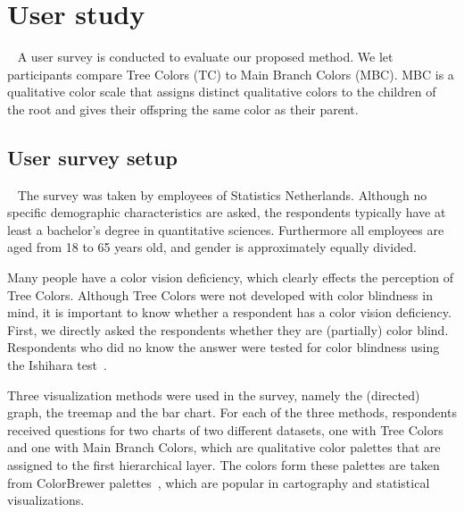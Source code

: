 \documentclass[journal]{vgtc}                %
\begin{document}
\section{User study}~\label{secuser}
A user survey is conducted to evaluate our proposed method. We let participants compare Tree Colors (TC) to Main Branch Colors (MBC). MBC is a qualitative color scale that assigns distinct qualitative colors to the children of the root and gives their offspring the same color as their parent.

\subsection{User survey setup}~\label{secusersetup}
The survey was taken by employees of Statistics Netherlands. Although no specific 
demographic characteristics are asked, the respondents typically have at least a bachelor's degree in 
quantitative sciences. Furthermore all employees are aged from 18 to 65 years old, and gender is 
approximately equally divided.

Many people have a color vision deficiency, which clearly effects the perception of Tree Colors. 
Although Tree Colors were not developed with color blindness in mind, it is important to know whether 
a respondent has a color vision deficiency. First, we directly asked the respondents 
whether they are (partially) color blind. Respondents who did no know the answer were tested for 
color blindness using the Ishihara test~\cite{ishihara}. 

Three visualization methods were used in the survey, namely the (directed) graph, the treemap and the bar chart. For each of the three methods, respondents received questions for two charts of two different datasets, one with Tree Colors and one with Main Branch Colors, which are qualitative color palettes that are assigned to the first hierarchical layer. The colors form these palettes are taken from ColorBrewer palettes~\cite{brewer03}, which are popular in cartography and statistical visualizations.
\end{document}
